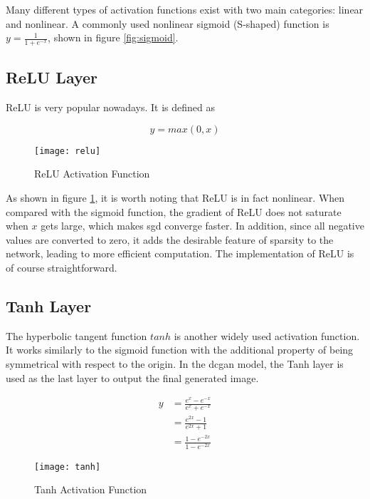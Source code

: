 Many different types of activation functions exist with two main categories: linear and nonlinear. A commonly
used nonlinear sigmoid (S-shaped) function is $y = \frac{1}{1 + e^{-x}}$, shown in figure \ref{fig:sigmoid}.

\subsection{ReLU Layer}

ReLU is very popular nowadays. It is defined as

\begin{equation} \label{eq:relu}
  y = max(0, x)
\end{equation}

\begin{figure}[h]
  \centering
  \texttt{[image: relu]}
  \caption{ReLU Activation Function}
  \label{fig:relu}
\end{figure}

As shown in figure \ref{fig:relu}, it is worth noting that ReLU is in fact nonlinear. When compared
with the sigmoid function, the
gradient of ReLU does not saturate when $x$ gets large, which makes \gls{sgd} converge faster. In addition,
since all negative values are converted to zero, it adds the desirable feature of sparsity to the network,
leading to more efficient computation. The implementation of ReLU is of course straightforward.

\subsection{Tanh Layer}

The hyperbolic tangent function $tanh$ is another widely used activation function. It works similarly to the
sigmoid function with the additional property of being symmetrical with respect to the origin. In the \gls{dcgan} model, the Tanh layer is used as the last layer to output the final generated image.

\begin{equation} \label{eq:tanh}
  \begin{split}
    y & = \frac{e^x - e^{-x}}{e^{x} + e^{-x}} \\
      & = \frac{e^{2x} - 1}{e^{2x} + 1} \\
      & = \frac{1- e^{-2x}}{1 - e^{-2x}}
  \end{split}
\end{equation}

\begin{figure}[h]
  \centering
  \texttt{[image: tanh]}
  \caption{Tanh Activation Function}
  \label{fig:tanh}
\end{figure}

\clearpage %
